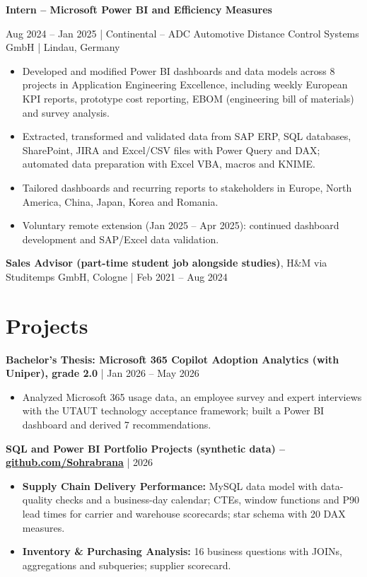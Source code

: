 \documentclass[10pt,a4paper]{article}
\newcommand{\role}[4]{%
  \vspace{0.22em}%
  {\bfseries #1}\par
  {\color{muted}#2} | {\color{accent}#3} | {\color{muted}#4}\par}
\newcommand{\entry}[2]{%
  \vspace{0.22em}%
  {\bfseries #1} | {\color{muted}#2}\par}
\begin{document}
\role{Intern – Microsoft Power BI and Efficiency Measures}{Aug 2024 – Jan 2025}
     {Continental – ADC Automotive Distance Control Systems GmbH}{Lindau, Germany}
\begin{itemize}
  \item Developed and modified Power BI dashboards and data models across 8 projects in Application Engineering Excellence, including weekly European KPI reports, prototype cost reporting, EBOM (engineering bill of materials) and survey analysis.
  \item Extracted, transformed and validated data from SAP ERP, SQL databases, SharePoint, JIRA and Excel/CSV files with Power Query and DAX; automated data preparation with Excel VBA, macros and KNIME.
  \item Tailored dashboards and recurring reports to stakeholders in Europe, North America, China, Japan, Korea and Romania.
  \item Voluntary remote extension (Jan 2025 – Apr 2025): continued dashboard development and SAP/Excel data validation.
\end{itemize}

\vspace{0.22em}%
{\bfseries Sales Advisor (part-time student job alongside studies)}, {\color{accent}H\&M via Studitemps GmbH}, Cologne | {\color{muted}Feb 2021 – Aug 2024}\par

\section{Projects}

\entry{Bachelor's Thesis: Microsoft 365 Copilot Adoption Analytics (with Uniper), grade 2.0}{Jan 2026 – May 2026}
\begin{itemize}
  \item Analyzed Microsoft 365 usage data, an employee survey and expert interviews with the UTAUT technology acceptance framework; built a Power BI dashboard and derived 7 recommendations.
\end{itemize}

\entry{SQL and Power BI Portfolio Projects (synthetic data) – \href{https://github.com/Sohrabrana}{github.com/Sohrabrana}}{2026}
\begin{itemize}
  \item \textbf{Supply Chain Delivery Performance:} MySQL data model with data-quality checks and a business-day calendar; CTEs, window functions and P90 lead times for carrier and warehouse scorecards; star schema with 20 DAX measures.
  \item \textbf{Inventory \& Purchasing Analysis:} 16 business questions with JOINs, aggregations and subqueries; supplier scorecard.
\end{itemize}
\end{document}
